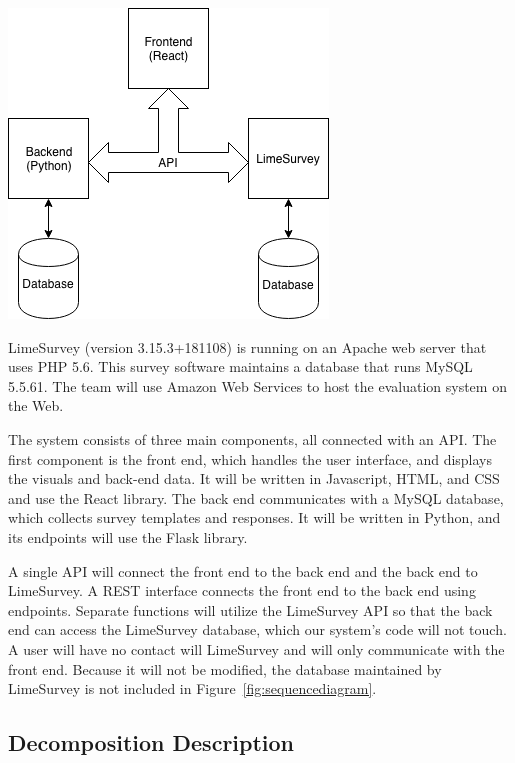 \documentclass{article}
\begin{document}
\begin{center}
\label{fig:componentdiagram}
{\includegraphics[scale=.7]{images/component_diagram.png}} 
\end{center}

\vspace{3mm}

LimeSurvey (version 3.15.3+181108) is running on an Apache web server that uses PHP 5.6. This survey software maintains a database that runs MySQL 5.5.61. The team will use Amazon Web Services to host the evaluation system on the Web.

The system consists of three main components, all connected with an API. The first component is the front end, which handles the user interface, and displays the visuals and back-end data. It will be written in Javascript, HTML, and CSS and use the React library. The back end communicates with a MySQL database, which collects survey templates and responses. It will be written in Python, and its endpoints will use the Flask library.

A single API will connect the front end to the back end and the back end to LimeSurvey. A REST interface connects the front end to the back end using endpoints. Separate functions will utilize the LimeSurvey API so that the back end can access the LimeSurvey database, which our system's code will not touch. A user will have no contact will LimeSurvey and will only communicate with the front end. Because it will not be modified, the database maintained by LimeSurvey is not included in Figure~\ref{fig:sequencediagram}. 

\subsection{Decomposition Description}
\end{document}
